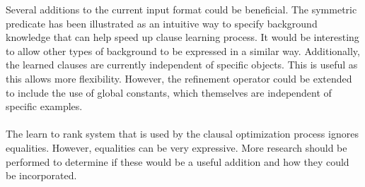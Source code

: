 Several additions to the current input format could be beneficial.
The symmetric predicate has been illustrated as an intuitive way to specify background knowledge that can help speed up clause learning process.
It would be interesting to allow other types of background to be expressed in a similar way.
Additionally, the learned clauses are currently independent of specific objects.
This is useful as this allows more flexibility.
However, the refinement operator could be extended to include the use of global constants, which themselves are independent of specific examples.
\\\\
The learn to rank system that is used by the clausal optimization process ignores equalities.
However, equalities can be very expressive.
More research should be performed to determine if these would be a useful addition and how they could be incorporated.